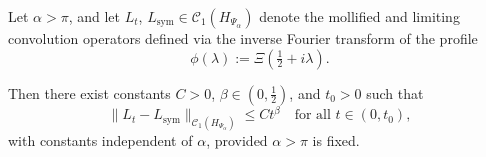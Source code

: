 \begin{lemma}
\label{lem:trace-norm-rate-convergence}
Let \( \alpha > \pi \), and let \( L_t \), \( L_{\mathrm{sym}} \in \mathcal{C}_1(H_{\Psi_\alpha}) \) denote the mollified and limiting convolution operators defined via the inverse Fourier transform of the profile
\[
\phi(\lambda) := \Xi\left( \tfrac{1}{2} + i\lambda \right).
\]

Then there exist constants \( C > 0 \), \( \beta \in (0, \tfrac{1}{2}) \), and \( t_0 > 0 \) such that
\[
\| L_t - L_{\mathrm{sym}} \|_{\mathcal{C}_1(H_{\Psi_\alpha})} \le C t^\beta \quad \text{for all } t \in (0, t_0),
\]
with constants independent of \( \alpha \), provided \( \alpha > \pi \) is fixed.
\end{lemma}
% 